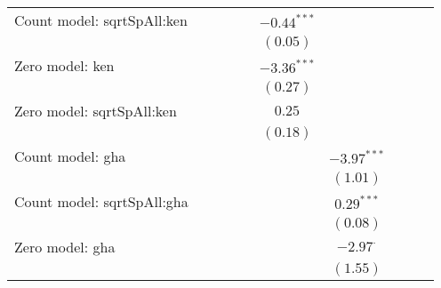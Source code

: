 \begin{table}
\begin{center}
{\begin{tabular}{l c c c c c c c c c}
Count model: sqrtSpAll:ken     &               &               &               &               & $-0.44^{***}$   &                 &               &                &               \\
                               &               &               &               &               & $(0.05)$        &                 &               &                &               \\
Zero model: ken                &               &               &               &               & $-3.36^{***}$   &                 &               &                &               \\
                               &               &               &               &               & $(0.27)$        &                 &               &                &               \\
Zero model: sqrtSpAll:ken      &               &               &               &               & $0.25$          &                 &               &                &               \\
                               &               &               &               &               & $(0.18)$        &                 &               &                &               \\
Count model: gha               &               &               &               &               &                 & $-3.97^{***}$   &               &                &               \\
                               &               &               &               &               &                 & $(1.01)$        &               &                &               \\
Count model: sqrtSpAll:gha     &               &               &               &               &                 & $0.29^{***}$    &               &                &               \\
                               &               &               &               &               &                 & $(0.08)$        &               &                &               \\
Zero model: gha                &               &               &               &               &                 & $-2.97^{\cdot}$ &               &                &               \\
                               &               &               &               &               &                 & $(1.55)$        &               &                &               \\

\end{tabular}}
\end{center}
\end{table}
